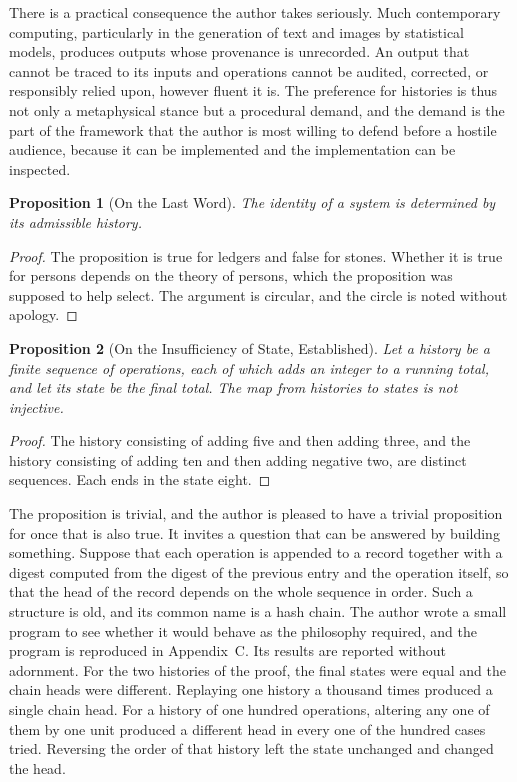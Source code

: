 \documentclass[11pt,openany,twoside]{book}
\theoremstyle{plain}
\newtheorem{proposition}{Proposition}[chapter]
\theoremstyle{definition}
\theoremstyle{remark}
\begin{document}
There is a practical consequence the author takes seriously. Much contemporary computing, particularly in the generation of text and images by statistical models, produces outputs whose provenance is unrecorded. An output that cannot be traced to its inputs and operations cannot be audited, corrected, or responsibly relied upon, however fluent it is. The preference for histories is thus not only a metaphysical stance but a procedural demand, and the demand is the part of the framework that the author is most willing to defend before a hostile audience, because it can be implemented and the implementation can be inspected.

\begin{proposition}[On the Last Word]\label{prop:history}
The identity of a system is determined by its admissible history.
\end{proposition}

\begin{proof}
The proposition is true for ledgers and false for stones. Whether it is true for persons depends on the theory of persons, which the proposition was supposed to help select. The argument is circular, and the circle is noted without apology.
\end{proof}

\begin{proposition}[On the Insufficiency of State, Established]\label{prop:state}
Let a history be a finite sequence of operations, each of which adds an integer to a running total, and let its state be the final total. The map from histories to states is not injective.
\end{proposition}

\begin{proof}
The history consisting of adding five and then adding three, and the history consisting of adding ten and then adding negative two, are distinct sequences. Each ends in the state eight.
\end{proof}

The proposition is trivial, and the author is pleased to have a trivial proposition for once that is also true. It invites a question that can be answered by building something. Suppose that each operation is appended to a record together with a digest computed from the digest of the previous entry and the operation itself, so that the head of the record depends on the whole sequence in order. Such a structure is old, and its common name is a hash chain. The author wrote a small program to see whether it would behave as the philosophy required, and the program is reproduced in Appendix~C. Its results are reported without adornment. For the two histories of the proof, the final states were equal and the chain heads were different. Replaying one history a thousand times produced a single chain head. For a history of one hundred operations, altering any one of them by one unit produced a different head in every one of the hundred cases tried. Reversing the order of that history left the state unchanged and changed the head.
\end{document}

